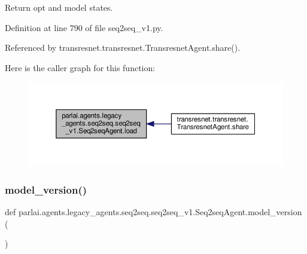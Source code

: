 \begin{DoxyVerb}Return opt and model states.\end{DoxyVerb}
 

Definition at line 790 of file seq2seq\+\_\+v1.\+py.



Referenced by transresnet.\+transresnet.\+Transresnet\+Agent.\+share().

Here is the caller graph for this function\+:
\nopagebreak
\begin{figure}[H]
\begin{center}
\leavevmode
\includegraphics[width=350pt]{classparlai_1_1agents_1_1legacy__agents_1_1seq2seq_1_1seq2seq__v1_1_1Seq2seqAgent_a3ee5ae38c0e37bcc1e4eb44bae8a3cce_icgraph}
\end{center}
\end{figure}
\mbox{\label{classparlai_1_1agents_1_1legacy__agents_1_1seq2seq_1_1seq2seq__v1_1_1Seq2seqAgent_a3838eb2d88b4e9f80c9c234e6742fa30}} 
\subsubsection{\texorpdfstring{model\+\_\+version()}{model\_version()}}
{\footnotesize\ttfamily def parlai.\+agents.\+legacy\+\_\+agents.\+seq2seq.\+seq2seq\+\_\+v1.\+Seq2seq\+Agent.\+model\+\_\+version (\begin{DoxyParamCaption}{ }\end{DoxyParamCaption})\hspace{0.3cm}{\ttfamily [static]}}

